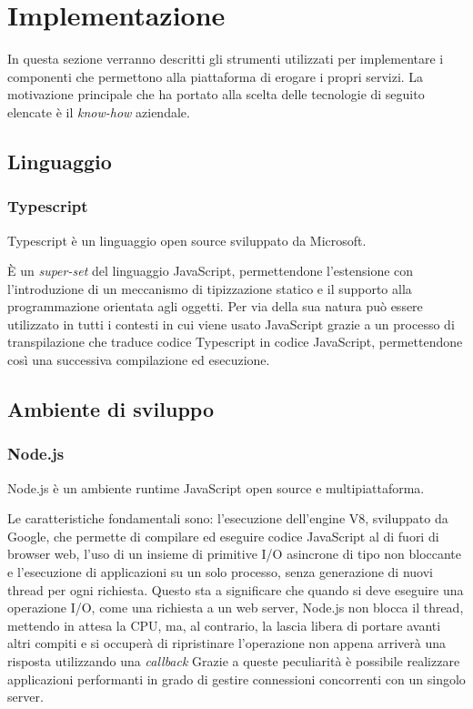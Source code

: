 \section{Implementazione}
In questa sezione verranno descritti gli strumenti utilizzati per implementare i componenti che
permettono alla piattaforma di erogare i propri servizi.
La motivazione principale che ha portato alla scelta delle tecnologie di seguito elencate è il \textit{know-how} aziendale.

\subsection{Linguaggio}
\subsubsection{Typescript}
Typescript\cite{Typescript} è un linguaggio open source sviluppato da Microsoft.

È un \textit{super-set} del linguaggio JavaScript, permettendone l'estensione
con l'introduzione di un meccanismo di tipizzazione statico e il supporto alla programmazione orientata agli oggetti.
Per via della sua natura può essere utilizzato in tutti i contesti in cui viene usato JavaScript grazie a un processo di transpilazione che traduce codice
Typescript in codice JavaScript, permettendone così una successiva compilazione ed esecuzione.

\subsection{Ambiente di sviluppo}
\subsubsection{Node.js}
Node.js\cite{Node} è un ambiente runtime JavaScript open source e multipiattaforma.

Le caratteristiche fondamentali sono: l'esecuzione dell'engine V8, sviluppato da Google, che permette di compilare ed eseguire codice JavaScript al di fuori di browser web,
l'uso di un insieme di primitive I/O asincrone di tipo non bloccante e l'esecuzione di applicazioni su un solo processo, senza generazione di nuovi thread per ogni richiesta.
Questo sta a significare che quando si deve eseguire una operazione I/O, come una richiesta a un web server, Node.js non blocca il thread, mettendo in attesa la CPU, ma, al contrario,
la lascia libera di portare avanti altri compiti e si occuperà di ripristinare l'operazione non appena arriverà una risposta utilizzando una \textit{callback}
Grazie a queste peculiarità è possibile realizzare applicazioni performanti in grado di gestire connessioni concorrenti con un singolo server.


